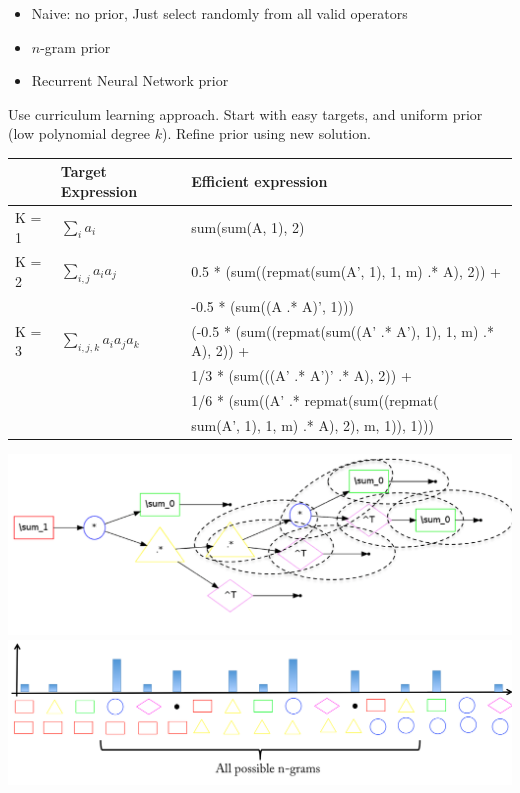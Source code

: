 \documentclass[landscape,a0b]{a0poster_csml_v2}
\begin{document}
\begin{poster}
\begin{PosterColumn}
\vspace{-1cm}
\begin{itemize}
  \item Naive: no prior, Just select randomly from all valid operators
  \item $n$-gram prior
  \item Recurrent Neural Network prior
\end{itemize}

Use curriculum learning approach.
Start with easy targets, and uniform prior (low polynomial degree $k$). 
Refine prior using new solution.
\vspace{0.5cm}
\\
\begin{minipage}[hc]{\textwidth}
  \begin{center}
    \begin{tabular}{lll}
      \hline
        & Target Expression & Efficient expression \\
      \hline
      K = 1 \hspace{1cm} & $\sum_i a_i \hspace{1cm} $ & sum(sum(A, 1), 2) \\
      \hline
      K = 2 & $\sum_{i,j} a_ia_j $ & 0.5 * (sum((repmat(sum(A', 1), 1, m) .* A), 2)) + \\
            & & -0.5 * (sum((A .* A)', 1))) \\
      \hline
      K = 3 & $\sum_{i, j, k}a_ia_ja_k$ & (-0.5 * (sum((repmat(sum((A' .* A'), 1), 1, m) .* A), 2)) + \\
      & & 1/3 * (sum(((A' .* A')' .* A), 2)) + \\
      & & 1/6 * (sum((A' .* repmat(sum((repmat( \\
      & & sum(A', 1), 1, m) .* A), 2), m, 1)), 1))) \\
      \hline
    \end{tabular}
  \end{center}
\end{minipage}

\end{PosterColumn}
\begin{PosterColumn} 

\begin{minipage}[hc]{\textwidth}
  \centering
  \includegraphics[width=0.40\linewidth]{imgs/bigram.png}
  \hfill
  \includegraphics[width=0.40\linewidth]{imgs/histogram.png}
\end{minipage}


\end{PosterColumn}
\end{poster}
\end{document}
